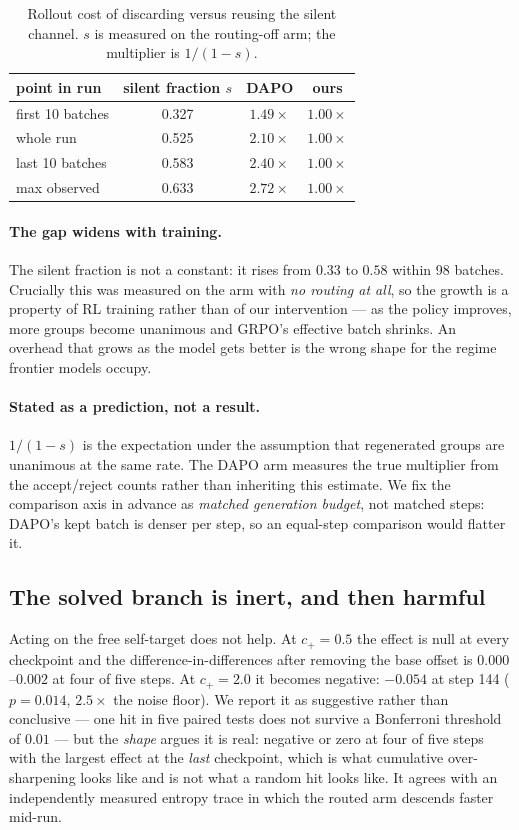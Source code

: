 \begin{table}[t]
\centering\small
\caption{Rollout cost of discarding versus reusing the silent channel. $s$ is measured on the
routing-off arm; the multiplier is $1/(1-s)$.}
\label{tab:cost}
\begin{tabular}{lccc}
\toprule
point in run & silent fraction $s$ & DAPO & ours \\
\midrule
first 10 batches & 0.327 & $1.49\times$ & $1.00\times$ \\
whole run        & 0.525 & $2.10\times$ & $1.00\times$ \\
last 10 batches  & 0.583 & $2.40\times$ & $1.00\times$ \\
max observed     & 0.633 & $2.72\times$ & $1.00\times$ \\
\bottomrule
\end{tabular}
\end{table}

\paragraph{The gap widens with training.} The silent fraction is not a constant: it rises
from $0.33$ to $0.58$ within 98 batches. Crucially this was measured on the arm with
\emph{no routing at all}, so the growth is a property of RL training rather than of our
intervention --- as the policy improves, more groups become unanimous and GRPO's effective
batch shrinks. An overhead that grows as the model gets better is the wrong shape for the
regime frontier models occupy.

\paragraph{Stated as a prediction, not a result.} $1/(1-s)$ is the expectation under the
assumption that regenerated groups are unanimous at the same rate. The DAPO arm measures the
true multiplier from the accept/reject counts rather than inheriting this estimate. We fix
the comparison axis in advance as \emph{matched generation budget}, not matched steps: DAPO's
kept batch is denser per step, so an equal-step comparison would flatter it.

\subsection{The solved branch is inert, and then harmful}
\label{sec:solvedbranch}

Acting on the free self-target does not help. At $c_+=0.5$ the effect is null at every
checkpoint and the difference-in-differences after removing the base offset is $0.000$--$0.002$
at four of five steps. At $c_+=2.0$ it becomes negative: $-0.054$ at step 144
($p=0.014$, $2.5\times$ the noise floor). We report it as suggestive rather than conclusive
--- one hit in five paired tests does not survive a Bonferroni threshold of $0.01$ --- but the
\emph{shape} argues it is real: negative or zero at four of five steps with the largest effect
at the \emph{last} checkpoint, which is what cumulative over-sharpening looks like and is not
what a random hit looks like. It agrees with an independently measured entropy trace in which
the routed arm descends faster mid-run.

